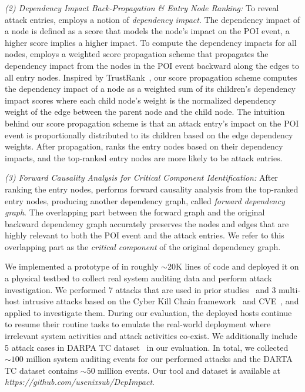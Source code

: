 \emph{(2) Dependency Impact Back-Propagation \& Entry Node Ranking:} 
To reveal attack entries, \tool employs a notion of \emph{dependency impact}. The dependency impact of a node is defined as a score that models the node's impact on the POI event, \ie a higher score implies a higher impact.
To compute the dependency impacts for all nodes, \tool employs a weighted score propagation scheme that propagates the dependency impact from the nodes in the POI event backward along the edges to all entry nodes.
Inspired by TrustRank~\cite{Gyongyi:2004:vldb}, our score propagation scheme computes the dependency impact of a node as a weighted sum of its children's dependency impact scores where each child node's weight is the normalized  dependency weight of the edge between the parent node and the child node.
The intuition behind our score propagation scheme is that an attack entry's impact on the POI event is proportionally distributed to its children based on the edge dependency weights. 
After propagation, \tool ranks the entry nodes based on their dependency impacts, and the top-ranked entry nodes are more likely to be attack entries.

\emph{(3) Forward Causality Analysis for Critical Component Identification:} 
After ranking the entry nodes, \tool performs forward causality analysis from the top-ranked entry nodes, producing another dependency graph, called \textit{forward dependency graph}. 
The overlapping part between the forward graph and the original backward dependency graph accurately preserves the nodes and edges that are highly relevant to both the POI event and the attack entries. 
We refer to this  overlapping part as the \emph{critical component} of the original dependency graph.

We implemented a prototype of \tool in roughly $\sim$20K lines of code and deployed it on a physical testbed to collect real system auditing data and perform attack investigation.
We performed 7 attacks that are used in prior studies~\cite{exploitdb,liu2018priotracker,kwon2018mci,reduction} and 3 multi-host intrusive attacks based on the Cyber Kill Chain framework~\cite{cyberkillchain} and CVE~\cite{cve}, and applied \tool to investigate them. 
During our evaluation, the deployed hosts continue to resume their routine tasks to emulate the real-world deployment where irrelevant system activities and attack activities co-exist. 
We additionally include 5 attack cases in DARPA TC dataset~\cite{tc} in our evaluation. 
In total, we collected ${\sim}100$ million system auditing events for our performed attacks and the DARTA TC dataset contains ${\sim}50$ million events.
Our tool and dataset is available at \textit{https://github.com/usenixsub/DepImpact}.

